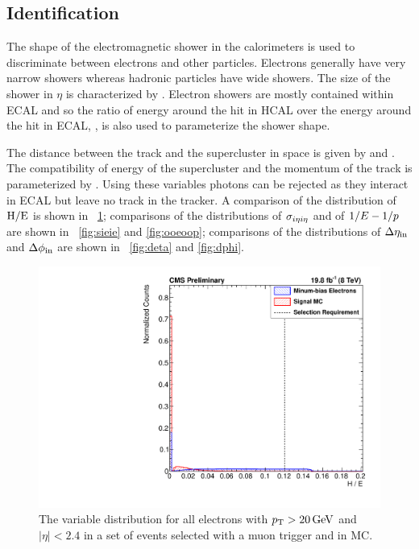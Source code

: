 \subsection{Identification}

The shape of the electromagnetic shower in the calorimeters is used to
discriminate between electrons and other particles. Electrons generally have
very narrow showers whereas hadronic particles have wide showers. The size of
the shower in $\eta$ is characterized by \sigmaietaieta. Electron showers are
mostly contained within ECAL and so the ratio of energy around the hit in HCAL
over the energy around the hit in ECAL, \HOverE, is also used to parameterize
the shower shape.

The distance between the track and the supercluster in \coordetaphi space is
given by \dphiin and \detain. The compatibility of energy of the supercluster
and the momentum of the track is parameterized by \ooeoop. Using these
variables photons can be rejected as they interact in ECAL but leave no track
in the tracker. A comparison of the distribution of $\text{H}/\text{E}$ is shown in
\FIG~\ref{fig:he}; comparisons of the distributions of $\sigma_{i \eta i \eta}$ and of
$1/E - 1/p$ are shown in \FIGS~\ref{fig:sieie} and \ref{fig:ooeoop}; comparisons
of the distributions of $\Delta \eta_{\text{in}}$ and $\Delta \phi_{\text{in}}$ are shown in
\FIGS~\ref{fig:deta} and \ref{fig:dphi}.

\begin{figure}[!htbp]
    \centering
    \includegraphics[width=\StackedPlotWidth]{figures/e_reco_var_he.pdf}
    \caption[
        Distributions of \HOverE variable in data and MC.
    ]{
        The \HOverE variable distribution for all electrons with $p_{\mathrm{T}} > 20
        \,\text{Ge\hspace{-.08em}V}$ and $|\eta| < 2.4$ in a set of events selected with a muon
        trigger and in \MADGRAPH \Ztoee MC.
    }
    \label{fig:he}
\end{figure}

